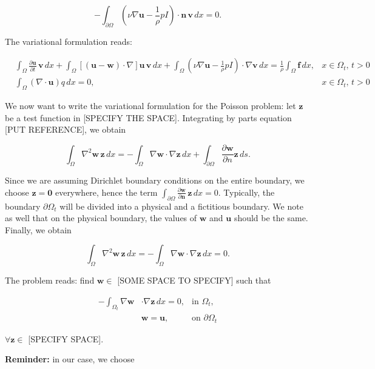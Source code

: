 \documentclass[11pt,a4paper,titlepage]{report}
\begin{document}
\[- \int_{\partial \Omega} (\nu \nabla \mathbf{u} -  \frac{1}{\rho}  pI) \cdot \mathbf{n} \, \mathbf{v} \, dx = 0.\]

The variational formulation reads:

\[
\begin{aligned}
& \int_{\Omega} \frac{\partial \mathbf{u}}{\partial t} \, \mathbf{v} \, dx
+ \int_{\Omega} [(\mathbf{u - w}) \cdot \nabla] \mathbf{u} \, \mathbf{v} \, dx
+ \int_{\Omega} (\nu \nabla \mathbf{u} -  \frac{1}{\rho}  pI) \cdot \nabla \mathbf{v} \, dx
=  \frac{1}{\rho} \int_{\Omega} \mathbf{f} \, dx,  & x \in \Omega_t, \, t>0 \\
& \int_{\Omega} ( \nabla \cdot \mathbf{u} ) q \, dx = 0 , & x \in \Omega_t, \, t>0
\end{aligned}
\]

We now want to write the variational formulation for the Poisson problem: let $\mathbf{z}$ be a test function in [SPECIFY THE SPACE]. Integrating by parts equation [PUT REFERENCE], we obtain

\[
\int_{\Omega} \nabla^2 \mathbf{w} \, \mathbf{z} \, dx = - \int_{\Omega} \nabla \mathbf{w} \cdot \nabla \mathbf{z} \, dx + \int_{\partial \Omega} \frac{\partial \mathbf{w}}{\partial n} \mathbf{z} \, ds.
\]

Since we are assuming Dirichlet boundary conditions on the entire boundary, we choose $\mathbf{z = 0}$ everywhere, hence the term $\int_{\partial \Omega} \frac{\partial \mathbf{w}}{\partial \mathbf{n}} \, \mathbf{z} \, dx  = 0 $. Typically, the boundary $\partial \Omega_t$ will be divided into a physical and a fictitious boundary. We note as well that on the physical boundary, the values of $\mathbf{w}$ and $\mathbf{u}$ should be the same.
Finally, we obtain

\[
\int_{\Omega} \nabla^2 \mathbf{w} \, \mathbf{z} \, dx = - \int_{\Omega} \nabla \mathbf{w} \cdot \nabla \mathbf{z} \, dx = 0.
\]

The problem reads: find $\mathbf{w} \in$ [SOME SPACE TO SPECIFY] such that

\[
\begin{aligned}
-  \int_{\Omega_t} \nabla \mathbf{w} & \cdot \nabla \mathbf{z} \, dx = 0, & \text{in } \Omega_t, \\
& \mathbf{w} = \mathbf{u}, & \text{on } \partial \Omega_t
\end{aligned}
\]

$\forall \mathbf{z} \in $ [SPECIFY SPACE].

\textbf{Reminder:} in our case, we choose
\end{document}
